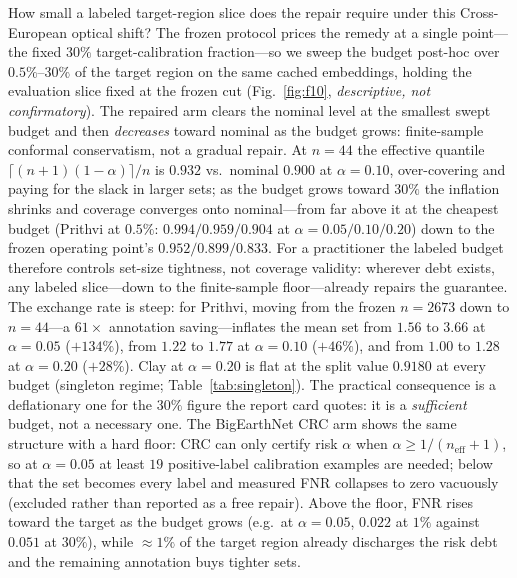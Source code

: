 \documentclass[journal]{IEEEtran}
\renewcommand{\_}{\textunderscore\allowbreak}
\begin{document}
How small a labeled target-region slice does the repair require under this Cross-European optical
shift? The frozen protocol prices the remedy at a single point---the fixed $30\%$ target-calibration
fraction---so we sweep the budget post-hoc over $0.5\%$--$30\%$ of the target region on the same cached
embeddings, holding the evaluation slice fixed at the frozen cut (Fig.~\ref{fig:f10}, \emph{descriptive,
not confirmatory}). The repaired arm clears the nominal level at the smallest swept budget and then
\emph{decreases} toward nominal as the budget grows: finite-sample conformal conservatism, not a gradual
repair. At $n{=}44$ the effective quantile
$\lceil (n{+}1)(1{-}\alpha)\rceil / n$ is $0.932$ vs.\ nominal $0.900$ at $\alpha{=}0.10$, over-covering
and paying for the slack in larger sets; as the budget grows toward $30\%$ the inflation shrinks and
coverage converges onto nominal---from far above it at the cheapest budget (Prithvi at $0.5\%$:
$0.994/0.959/0.904$ at $\alpha{=}0.05/0.10/0.20$) down to the frozen operating point's
$0.952/0.899/0.833$. For a practitioner the labeled budget therefore controls set-size tightness, not
coverage validity: wherever debt exists, any labeled slice---down to the finite-sample floor---already
repairs the guarantee. The exchange rate is steep: for Prithvi, moving from the frozen $n{=}2673$ down to
$n{=}44$---a $61{\times}$ annotation saving---inflates the mean set from $1.56$ to $3.66$ at
$\alpha{=}0.05$ ($+134\%$), from $1.22$ to $1.77$ at $\alpha{=}0.10$ ($+46\%$), and from $1.00$ to
$1.28$ at $\alpha{=}0.20$ ($+28\%$). Clay at $\alpha{=}0.20$ is flat at the split value $0.9180$ at every
budget (singleton regime; Table~\ref{tab:singleton}). The practical consequence is a deflationary one for
the $30\%$ figure the report card quotes: it is a \emph{sufficient} budget, not a necessary one. The
BigEarthNet CRC arm shows the same structure with a hard floor: CRC can only certify risk $\alpha$ when
$\alpha \ge 1/(n_\mathrm{eff}{+}1)$, so at $\alpha{=}0.05$ at least $19$ positive-label calibration
examples are needed; below that the set becomes every label and measured FNR collapses to zero
vacuously (excluded rather than reported as a free repair). Above the floor, FNR rises toward the target
as the budget grows (e.g.\ at $\alpha{=}0.05$, $0.022$ at $1\%$ against $0.051$ at $30\%$), while
${\approx}1\%$ of the target region already discharges the risk debt and the remaining annotation buys
tighter sets.
\end{document}
